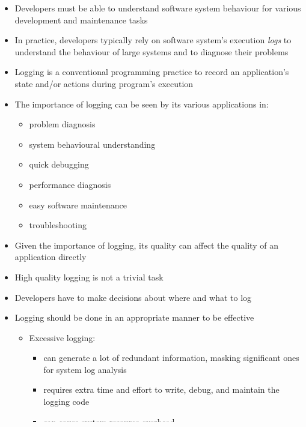 \documentclass{article}
\begin{document}
\begin{itemize} [leftmargin=.1in]
\item {} Developers must be able to understand software system behaviour for various development and maintenance tasks
\item In practice, developers typically rely on software system's execution \emph{logs} to understand the behaviour of large systems and to diagnose their problems
\item Logging is a conventional programming practice to record an application's state and/or actions during program's execution
\item The importance of logging can be seen by its various applications in:
\begin{itemize}
\item{problem diagnosis}
\item{system behavioural understanding}
\item{quick debugging}
\item{performance diagnosis}
\item{ easy software maintenance }
 \item{ troubleshooting}
\end{itemize}

\item Given the importance of logging, its quality can affect the quality of an application directly
\item High quality logging is not a trivial task
\item Developers have to make decisions about where and what to log
\item Logging should be done in an appropriate manner to be effective
\begin{itemize}
\item Excessive logging:
\begin{itemize}
\item can generate a lot of redundant information, masking significant ones for system log analysis
\item requires extra time and effort to write, debug, and maintain the logging code
\item can cause system resource overhead
\end{itemize}
\item Bad usage of logging can affect the application's performance
\item Insufficient logging may result in losing some necessary run-time information for software analysis
\end{itemize}
\item The location of log statements has a great impact on the quality of logging since it helps developers to trace the code execution path and to identify the root causes of errors in log system analysis
\item So far, little study has been conducted on characterizing logging practices in real-world applications that would assist developers to make informed decisions about where and what to log
\item In this research, our focus is on the study of where developers log in practice



\end{itemize}
\end{document}
